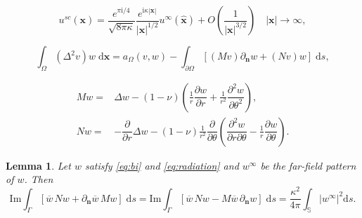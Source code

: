 \documentclass[10pt,a4paper]{amsart}
\newtheorem{lemma}{Lemma}
\begin{document}
\begin{equation}
  \label{eq:asy}
  u^{sc}(\bm{x}) = \dfrac{e^{\pi \mathrm{i}/4}}{\sqrt{8\pi\kappa}}
  \dfrac{e^{\mathrm{i}\kappa|\bm{x}|}}{|\bm{x}|^{1/2}}
u^{\infty}(\hat{\bm{x}}) + O\left(\dfrac{1}{|\bm{x}|^{3/2}} \right) \quad |\bm{x}|\to\infty,
\end{equation}

\begin{equation} \label{eq:green-1}
\int_{ \Omega } (\Delta^{2} v) w \;\mathrm{d}\bm{x} = a_{\Omega}(v,w) - \int_{ \partial \Omega } \left[(Mv)\partial_{\bm{n} } w + (Nv) w \right] \;\mathrm{d}s,
\end{equation}

  \begin{align}
    \label{eq:Mpolar}
  Mw  = & \Delta w - (1-\nu)\left( \frac{1}{r} \dfrac{\partial w}{\partial r} + \frac{1}{r^{2}} \dfrac{\partial^2 w}{\partial \theta^2}\right),   \\
    \label{eq:Npolar}
 N w  = & -\dfrac{\partial }{\partial r}\Delta w - (1-\nu) \frac{1}{r^{2}} \dfrac{\partial }{\partial \theta} \left(\dfrac{\partial^2 w}{\partial r \partial \theta} - \frac{1}{r} \dfrac{\partial w}{\partial \theta}\right).
  \end{align}

\begin{lemma}
  \label{lem:sign}
  Let $w$ satisfy \eqref{eq:bi} and \eqref{eq:radiation} and $w^{\infty}$ be the far-field pattern of $w$. Then
  \begin{equation*}
    \mathrm{Im} \int_{\Gamma}[\overline{w}\, N w +  \partial_{\bm{n}}\overline{w}\, M w] \;\mathrm{d}s
    =   \mathrm{Im} \int_{\Gamma}[\overline{w}\, N w -M  \overline{w}\,  \partial_{\bm{n}}w] \;\mathrm{d}s
    = \frac{\kappa^{2}}{4\pi}\int_{\mathbb{S}}|w^{\infty}|^{2}\mathrm{d}s.
  \end{equation*}
\end{lemma}
\end{document}
